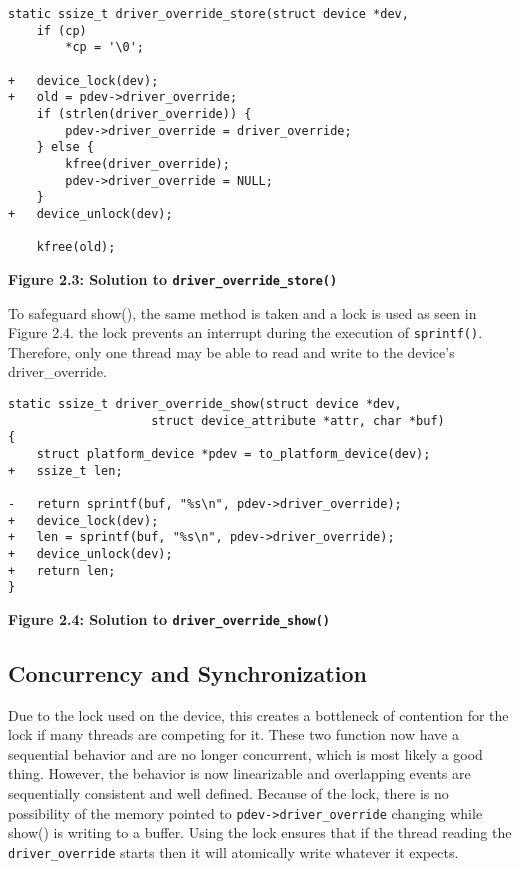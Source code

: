 \documentclass[12pt]{article}
\begin{document}
%
% 

\begin{lstlisting}[style=CStyle]
static ssize_t driver_override_store(struct device *dev,
 	if (cp)
 		*cp = '\0';
 
+	device_lock(dev);
+	old = pdev->driver_override;
 	if (strlen(driver_override)) {
 		pdev->driver_override = driver_override;
 	} else {
 		kfree(driver_override);
 		pdev->driver_override = NULL;
 	}
+	device_unlock(dev);
 
 	kfree(old);
\end{lstlisting}
\centerline{\textbf{Figure 2.3: Solution to \texttt{driver\_override\_store()}}}
\vspace{12pt}

To safeguard show(), the same method is taken and a lock is used as seen in Figure 2.4. the lock prevents an interrupt during the execution of \texttt{sprintf()}. Therefore, only one thread may be able to read and write to the device's driver\_override.
\begin{lstlisting}[style=CStyle]
static ssize_t driver_override_show(struct device *dev,
 				    struct device_attribute *attr, char *buf)
{
 	struct platform_device *pdev = to_platform_device(dev);
+	ssize_t len;
 
-	return sprintf(buf, "%s\n", pdev->driver_override);
+	device_lock(dev);
+	len = sprintf(buf, "%s\n", pdev->driver_override);
+	device_unlock(dev);
+	return len;
}
\end{lstlisting}
\centerline{\textbf{Figure 2.4: Solution to \texttt{driver\_override\_show()}}}
\vspace{12pt}

\subsection{Concurrency and Synchronization}
Due to the lock used on the device, this creates a bottleneck of contention for the lock if many threads are competing for it. These two function now have a sequential behavior and are no longer concurrent, which is most likely a good thing. However, the behavior is now linearizable and overlapping events are sequentially consistent and well defined. Because of the lock, there is no possibility of the memory pointed to \texttt{pdev->driver\_override} changing while show() is writing to a buffer. Using the lock ensures that if the thread reading the \texttt{driver\_override} starts then it will atomically write whatever it expects. 
\end{document}
